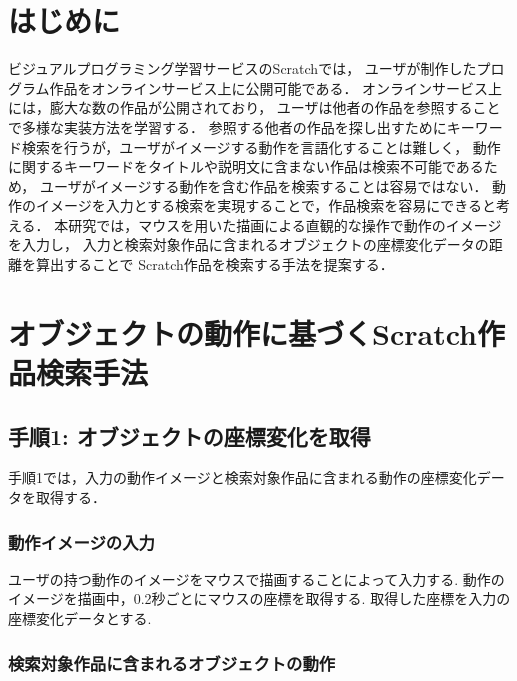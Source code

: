 \documentclass[twocolumn]{jarticle} %
\begin{document}
\maketitle
\thispagestyle{empty} %



\section{はじめに}
ビジュアルプログラミング学習サービスのScratchでは，
ユーザが制作したプログラム作品をオンラインサービス上に公開可能である．
オンラインサービス上には，膨大な数の作品が公開されており，
ユーザは他者の作品を参照することで多様な実装方法を学習する\cite{spfa}．
参照する他者の作品を探し出すためにキーワード検索を行うが，ユーザがイメージする動作を言語化することは難しく，
動作に関するキーワードをタイトルや説明文に含まない作品は検索不可能であるため，
ユーザがイメージする動作を含む作品を検索することは容易ではない\cite{wild}．
動作のイメージを入力とする検索を実現することで，作品検索を容易にできると考える．
本研究では，マウスを用いた描画による直観的な操作で動作のイメージを入力し，
入力と検索対象作品に含まれるオブジェクトの座標変化データの距離を算出することで
Scratch作品を検索する手法を提案する．

\section{オブジェクトの動作に基づくScratch作品検索手法}
\subsection{手順1: オブジェクトの座標変化を取得}
手順1では，入力の動作イメージと検索対象作品に含まれる動作の座標変化データを取得する．
\subsubsection{動作イメージの入力}
ユーザの持つ動作のイメージをマウスで描画することによって入力する.
動作のイメージを描画中，0.2秒ごとにマウスの座標を取得する.
取得した座標を入力の座標変化データとする.

\subsubsection{検索対象作品に含まれるオブジェクトの動作}
\end{document}
